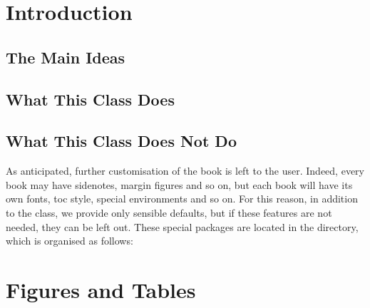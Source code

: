 \documentclass[
    a4paper, %
    fontsize=10pt, %
    twoside=false, %
	numbers=noenddot, %
	fontmethod=tex, %
]{kaobook}
\begin{document}
\mainmatter %
%
\setchapterpreamble[u]{\margintoc}
\chapter{Introduction}

\section{The Main Ideas}



\section{What This Class Does}





\section{What This Class Does Not Do}

As anticipated, further customisation of the book is left to the user. 
Indeed, every book may have sidenotes, margin figures and so on, but 
each book will have its own fonts, toc style, special environments and 
so on. For this reason, in addition to the class, we provide only 
sensible defaults, but if these features are not needed, they can be 
left out. These special packages are located in the  
directory, which is organised as follows:







%




\setchapterpreamble[u]{\margintoc}
\chapter{Figures and Tables}
\end{document}
